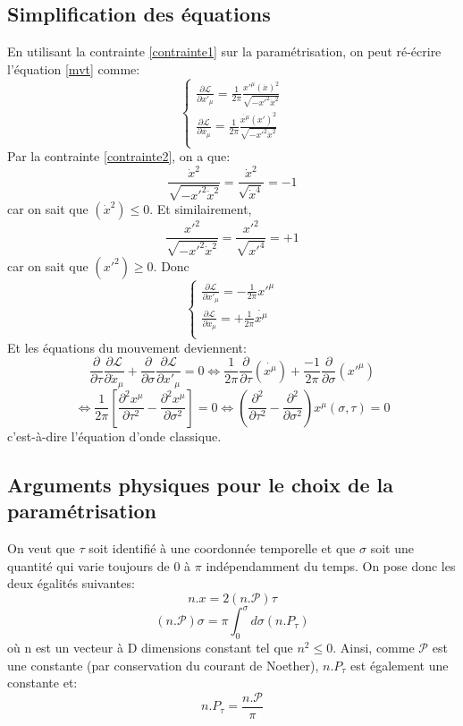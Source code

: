 \documentclass[a4paper,12pt]{article}
\def\xmu{x^\mu}
\def\CP{\mathcal{P}}
\def\CL{\mathcal{L}}
\begin{document}
\subsection{Simplification des équations}
En utilisant la contrainte \eqref{contrainte1} sur la paramétrisation, on peut ré-écrire l'équation \eqref{mvt} comme:
\begin{equation}
	\left\lbrace
	\begin{aligned}
	\frac{\partial \CL}{\partial x'_\mu }=\frac{1}{2\pi}\frac{x'^\mu (\dot{x})^2}{\sqrt{-x'^2\dot{x}^2}}\\
	\frac{\partial \CL}{\partial \dot{x_\mu}}=\frac{1}{2\pi}\frac{\dot{\xmu} (x')^2}{\sqrt{-x'^2\dot{x}^2}}\\
	\end{aligned}
	\right.
\end{equation}
Par la contrainte \eqref{contrainte2}, on a que:
$$\frac{\dot{x}^2}{\sqrt{-x'^2\dot{x}^2}}=\frac{\dot{x}^2}{\sqrt{\dot{x}^4}}=-1$$ car on sait que $(\dot{x}^2)\leq0$.
Et similairement,
$$\frac{x'^2}{\sqrt{-x'^2\dot{x}^2}}=\frac{x'^2}{\sqrt{x'^4}}=+1$$
car on sait que $(x'^2)\geq0$.
Donc
\begin{equation}
	\left\lbrace
	\begin{aligned}
	\frac{\partial \CL}{\partial x'_\mu }=-\frac{1}{2\pi}x'^\mu\\
	\frac{\partial \CL}{\partial \dot{x_\mu}}=+\frac{1}{2\pi}\dot{\xmu}\\
	\end{aligned}
	\right.
\end{equation}
Et les équations du mouvement deviennent:
$$\frac{\partial}{\partial \tau}\frac{\partial \CL}{\partial \dot x_{\mu}}+\frac{\partial}{\partial \sigma}\frac{\partial \CL}{\partial  x'_{\mu}}=0 \Leftrightarrow \frac{1}{2\pi}\frac{\partial}{\partial \tau}\left( \dot{\xmu}\right)+\frac{-1}{2\pi}\frac{\partial}{\partial \sigma}\left( x'^\mu\right) $$
$$\Leftrightarrow \frac{1}{2\pi}\left[ \frac{\partial^2 x^\mu}{\partial \tau^2}-\frac{\partial^2 x^\mu}{\partial \sigma^2}\right] =0 \Leftrightarrow \left( \frac{\partial^2}{\partial \tau^2}-\frac{\partial^2 }{\partial \sigma^2}\right) \xmu(\sigma,\tau)=0$$
c'est-à-dire l'équation d'onde classique.
\subsection{Arguments physiques pour le choix de la paramétrisation}
On veut que $\tau$ soit identifié à une coordonnée temporelle et que $\sigma$ soit une quantité qui varie toujours de $0$ à $\pi$ indépendamment du temps.
On pose donc les deux égalités suivantes:
$$n.x=2(n.\mathcal{P})\tau$$
$$(n.\mathcal{P})\sigma=\pi\int_0^\sigma d\sigma (n.P_\tau)$$
où n est un vecteur à D dimensions constant tel que $n^2\leq0$.
Ainsi, comme $\CP$ est une constante (par conservation du courant de Noether), 
$n.P_\tau$ est également une constante et:
$$n.P_\tau=\frac{n.\mathcal{P}}{\pi}$$\\
\end{document}
